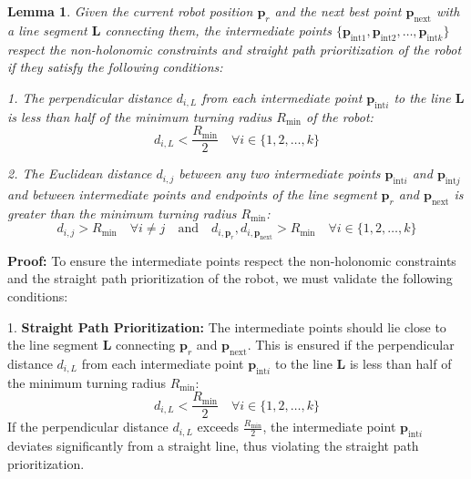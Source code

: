 


\newtheorem{lemma}{Lemma}[section]

\vspace*{6mm}  

\begin{lemma}
Given the current robot position $\mathbf{p}_r$ and the next best point $\mathbf{p}_{\text{next}}$ with a line segment $\mathbf{L}$ connecting them, the intermediate points $\{\mathbf{p}_{\text{int}1}, \mathbf{p}_{\text{int}2}, \ldots, \mathbf{p}_{\text{int}k}\}$ respect the non-holonomic constraints and straight path prioritization of the robot if they satisfy the following conditions:

\vspace*{6mm}  

1. The perpendicular distance $d_{i,L}$ from each intermediate point $\mathbf{p}_{\text{int}i}$ to the line $\mathbf{L}$ is less than half of the minimum turning radius $R_{\min}$ of the robot:
\[
d_{i,L} < \frac{R_{\min}}{2} \quad \forall i \in \{1, 2, \ldots, k\}
\]

\vspace*{6mm}  

2. The Euclidean distance $d_{i,j}$ between any two intermediate points $\mathbf{p}_{\text{int}i}$ and $\mathbf{p}_{\text{int}j}$ and between intermediate points and endpoints of the line segment $\mathbf{p}_r$ and $\mathbf{p}_{\text{next}}$ is greater than the minimum turning radius $R_{\min}$:
\[
d_{i,j} > R_{\min} \quad \forall i \neq j \quad \text{and} \quad d_{i,\mathbf{p}_r}, d_{i,\mathbf{p}_{\text{next}}} > R_{\min} \quad \forall i \in \{1, 2, \ldots, k\}
\]
\end{lemma}


\textbf{Proof:} 
To ensure the intermediate points respect the non-holonomic constraints and the straight path prioritization of the robot, we must validate the following conditions:

\vspace*{6mm}  

1. \textbf{Straight Path Prioritization:}
The intermediate points should lie close to the line segment $\mathbf{L}$ connecting $\mathbf{p}_r$ and $\mathbf{p}_{\text{next}}$. This is ensured if the perpendicular distance $d_{i,L}$ from each intermediate point $\mathbf{p}_{\text{int}i}$ to the line $\mathbf{L}$ is less than half of the minimum turning radius $R_{\min}$:
\[
d_{i,L} < \frac{R_{\min}}{2} \quad \forall i \in \{1, 2, \ldots, k\}
\]
If the perpendicular distance $d_{i,L}$ exceeds $\frac{R_{\min}}{2}$, the intermediate point $\mathbf{p}_{\text{int}i}$ deviates significantly from a straight line, thus violating the straight path prioritization.

